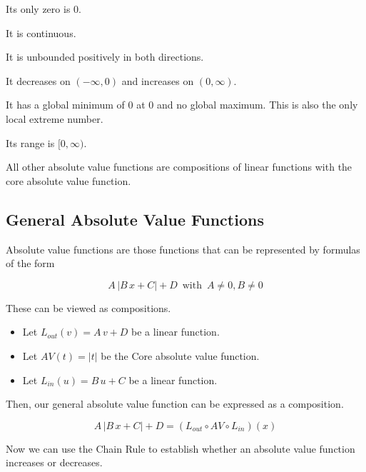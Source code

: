 \documentclass{ximera}
\begin{document}
Its only zero is $0$.

It is continuous.

It is unbounded positively in both directions.

It decreases on $(-\infty, 0)$ and increases on $(0, \infty)$.

It has a global minimum of $0$ at $0$ and no global maximum.  This is also the only local extreme number.

Its range is $[0, \infty)$.



All other absolute value functions are compositions of linear functions with the core absolute value function.












\subsection*{General Absolute Value Functions}

Absolute value functions are those functions that can be represented by formulas of the form


\[
A \, |B \, x + C| + D  \, \text{ with }  \, A \ne 0, B \ne 0
\]



These can be viewed as compositions.




\begin{itemize}
\item Let $L_{out}(v) = A \, v + D$ be a linear function.
\item Let $AV(t) = |t|$ be the Core absolute value function.
\item Let $L_{in}(u) = B \, u + C$ be a linear function.
\end{itemize}

Then, our general absolute value function can be expressed as a composition.


\[
 A \, |B \, x + C| + D = (L_{out} \circ AV \circ L_{in})(x)
\]



Now we can use the Chain Rule to establish whether an absolute value function increases or decreases.
\end{document}
